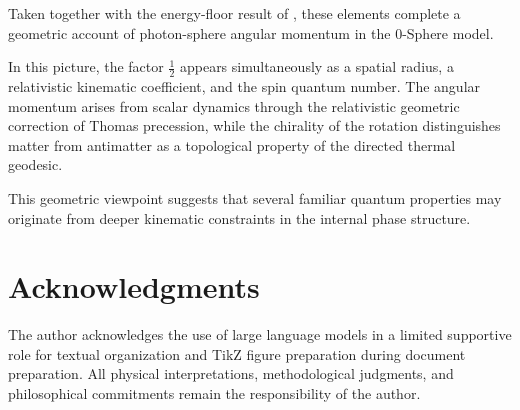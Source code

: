 \documentclass[%
 reprint, amsmath,amssymb, aps, prb, ]{revtex4-2}
\numberwithin{equation}{section}
\begin{document}
Taken together with the energy-floor result of \cite{hanamura46}, these elements complete a geometric account of photon-sphere angular momentum in the 0-Sphere model.

In this picture, the factor $\tfrac{1}{2}$ appears simultaneously as a spatial radius, a relativistic kinematic coefficient, and the spin quantum number. The angular momentum arises from scalar dynamics through the relativistic geometric correction of Thomas precession, while the chirality of the rotation distinguishes matter from antimatter as a topological property of the directed thermal geodesic.

This geometric viewpoint suggests that several familiar quantum properties may originate from deeper kinematic constraints in the internal phase structure.

\section*{Acknowledgments}

The author acknowledges the use of large language models in a limited supportive role for textual organization and TikZ figure preparation during document preparation. All physical interpretations, methodological judgments, and philosophical commitments remain the responsibility of the author.

\clearpage
\end{document}
